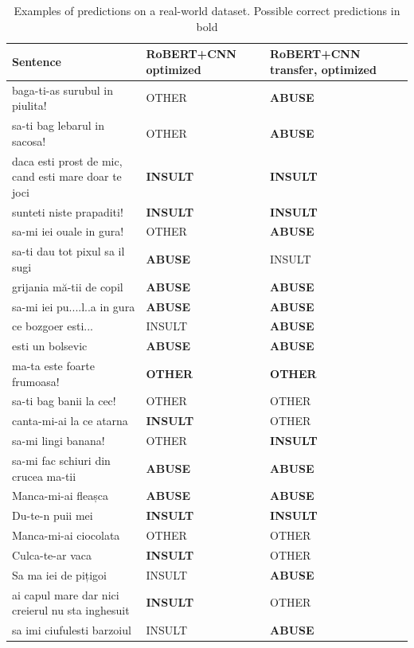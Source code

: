 \documentclass[12pt,a4paper]{report}
\begin{document}
\begin{table}[H]\small\linespread{1}
\centering
\caption{Examples of predictions on a real-world dataset. Possible correct predictions in bold}
\label{tab:unsupervisedTest}
\begin{tabular}{ p{8cm} | p{3cm} | p{3.5cm}} 
  \hline
  \textbf{Sentence} & \textbf{RoBERT+CNN optimized} & \textbf{RoBERT+CNN transfer, optimized}\\\hline
    baga-ti-as surubul in piulita! & OTHER & \textbf{ABUSE} \\\hline
    sa-ti bag lebarul in sacosa! & OTHER & \textbf{ABUSE} \\\hline
    daca esti prost de mic, cand esti mare doar te joci & \textbf{INSULT} & \textbf{INSULT} \\\hline
    sunteti niste prapaditi! & \textbf{INSULT} & \textbf{INSULT} \\\hline
    sa-mi iei ouale in gura! & OTHER & \textbf{ABUSE} \\\hline
    sa-ti dau tot pixul sa il sugi & \textbf{ABUSE} & INSULT \\\hline
    grijania mă-tii de copil & \textbf{ABUSE} & \textbf{ABUSE} \\\hline
    sa-mi iei pu....l..a in gura & \textbf{ABUSE} & \textbf{ABUSE} \\\hline
    ce bozgoer esti... & INSULT & \textbf{ABUSE} \\\hline
    esti un bolsevic & \textbf{ABUSE} & \textbf{ABUSE} \\\hline
    ma-ta este foarte frumoasa! & \textbf{OTHER} & \textbf{OTHER} \\\hline
    sa-ti bag banii la cec! & OTHER & OTHER \\\hline
    canta-mi-ai la ce atarna & \textbf{INSULT} & OTHER \\\hline
    sa-mi lingi banana! & OTHER & \textbf{INSULT} \\\hline
    sa-mi fac schiuri din crucea ma-tii & \textbf{ABUSE} & \textbf{ABUSE} \\\hline
    Manca-mi-ai fleașca & \textbf{ABUSE} & \textbf{ABUSE} \\\hline
    Du-te-n puii mei & \textbf{INSULT} & \textbf{INSULT} \\\hline
    Manca-mi-ai ciocolata & OTHER & OTHER \\\hline
    Culca-te-ar vaca & \textbf{INSULT} & OTHER \\\hline
    Sa ma iei de pițigoi  & INSULT & \textbf{ABUSE} \\\hline
    ai capul mare dar nici creierul nu sta inghesuit & \textbf{INSULT} & OTHER \\\hline
    sa imi ciufulesti barzoiul & INSULT  & \textbf{ABUSE} \\\hline
\end{tabular}
\end{table}
\end{document}
